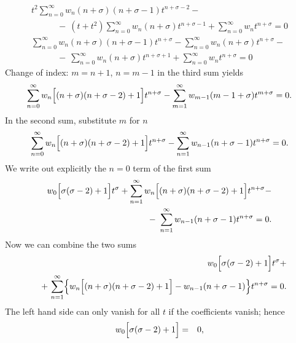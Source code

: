 {\begin{enumerate}
\begin{itemize}
\begin{equation*}
         \begin{split}
           t^2\sum_{n=0}^\infty w_n(n+\sigma)
             (n+\sigma-1)t^{n+\sigma-2}-\\
           \qquad\quad -\ (t+t^2)\sum_{n=0}^\infty
             w_n(n+\sigma)t^{n+\sigma-1}+
             \sum_{n=0}^\infty w_n t^{n+\sigma}=0\\
          \sum_{n=0}^\infty w_n(n+\sigma)(n+\sigma-1)t^{n+\sigma}-
             \sum_{n=0}^\infty w_n(n+\sigma)t^{n+\sigma}-\\
           \qquad\quad -\ \sum_{n=0}^\infty w_n(n+\sigma)
             t^{n+\sigma+1}+\sum_{n=0}^\infty w_n t^{n+\sigma}=0
         \end{split}
      \end{equation*}
      Change of index: $m=n+1$, $n=m-1$ in the third sum yields
      $$
         \sum_{n=0}^\infty w_n\Bigl[(n+\sigma)(n+\sigma-2)+1\Bigr]
         t^{n+\sigma}-
         \sum_{m=1}^\infty w_{m-1}(m-1+\sigma)t^{m+\sigma}=0.
      $$
      In the second sum, substitute $m$ for $n$
      $$
         \sum_{n=0}^\infty w_n\Bigl[(n+\sigma)(n+\sigma-2)+1\Bigr]
         t^{n+\sigma}-
         \sum_{n=1}^\infty w_{n-1}(n+\sigma-1)t^{n+\sigma}=0.
      $$
      We write out explicitly the  $n=0$ term of the first sum
      \begin{equation*}
         \begin{split}
            \displaystyle w_0\Bigl[\sigma(\sigma-2)+1\Bigr]t^\sigma+
               \sum_{n=1}^\infty w_n\Bigl[(n+\sigma)(n+\sigma-2)+1\Bigr]
               t^{n+\sigma}-\\
            \displaystyle \qquad -\ \sum_{n=1}^\infty
               w_{n-1}(n+\sigma-1)t^{n+\sigma}=0.
         \end{split}
      \end{equation*}
      Now we can combine the two sums
      \begin{equation*}
         \begin{split}
         \displaystyle w_0\Bigl[\sigma(\sigma-2)+1\Bigr]t^\sigma+\\
         \displaystyle \quad +\, \sum_{n=1}^\infty
            \Bigl\{w_n\Bigl[(n+\sigma)(n+\sigma-2)+1\Bigr]
            -w_{n-1}(n+\sigma-1)\Bigr\}t^{n+\sigma}=0.
         \end{split}
     \end{equation*}
      The left hand side can only vanish for all  $t$ if the coefficients vanish; hence
      \begin{eqnarray}
         w_0\Bigl[\sigma(\sigma-2)+1\Bigr]&=&0, \label{eqn:5.3.1}\\

\end{eqnarray}
\end{itemize}
\end{enumerate}}

